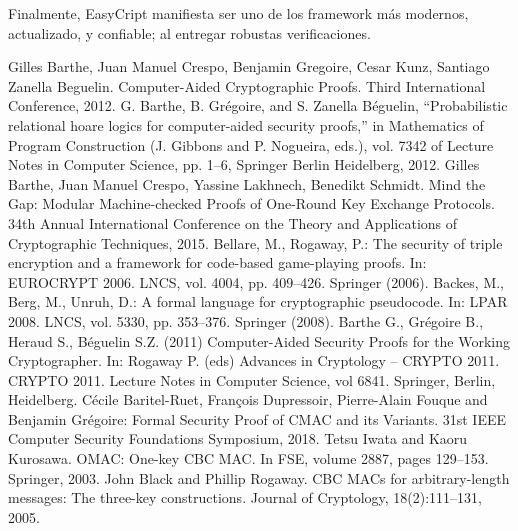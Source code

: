 \documentclass[runningheads]{llncs}
\begin{document}
Finalmente, EasyCript manifiesta ser uno de los framework más modernos, actualizado, y confiable; al entregar robustas verificaciones.

\begin{thebibliography}{8}
Gilles Barthe, Juan Manuel Crespo, Benjamin Gregoire, Cesar Kunz, Santiago Zanella Beguelin. Computer-Aided Cryptographic Proofs. Third International Conference, 2012.
G. Barthe, B. Grégoire, and S. Zanella Béguelin, “Probabilistic relational hoare
logics for computer-aided security proofs,” in Mathematics of Program Construction
(J. Gibbons and P. Nogueira, eds.), vol. 7342 of Lecture Notes in
Computer Science, pp. 1–6, Springer Berlin Heidelberg, 2012.
Gilles Barthe, Juan Manuel Crespo, Yassine Lakhnech, Benedikt Schmidt. Mind the Gap: Modular Machine-checked Proofs of One-Round Key Exchange Protocols. 34th Annual International Conference on the Theory and Applications of Cryptographic Techniques, 2015.
Bellare, M., Rogaway, P.: The security of triple encryption and a framework for
code-based game-playing proofs. In: EUROCRYPT 2006. LNCS, vol. 4004, pp.
409–426. Springer (2006).
Backes, M., Berg, M., Unruh, D.: A formal language for cryptographic pseudocode.
In: LPAR 2008. LNCS, vol. 5330, pp. 353–376. Springer (2008).
Barthe G., Grégoire B., Heraud S., Béguelin S.Z. (2011) Computer-Aided Security Proofs for the Working Cryptographer. In: Rogaway P. (eds) Advances in Cryptology – CRYPTO 2011. CRYPTO 2011. Lecture Notes in Computer Science, vol 6841. Springer, Berlin, Heidelberg.
Cécile Baritel-Ruet, François Dupressoir, Pierre-Alain Fouque and Benjamin Grégoire: Formal Security Proof of CMAC and its Variants.
31st IEEE Computer Security Foundations Symposium, 2018.
Tetsu Iwata and Kaoru Kurosawa. OMAC: One-key CBC MAC. In FSE, volume 2887, pages 129–153. Springer, 2003.
John Black and Phillip Rogaway. CBC MACs for arbitrary-length messages: The three-key constructions. Journal of Cryptology, 18(2):111–131, 2005.

\end{thebibliography}
\end{document}
